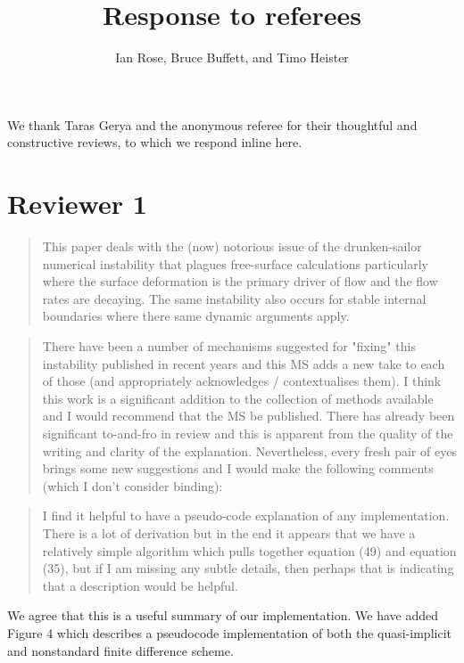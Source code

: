 \documentclass[a4paper,12pt]{article}
\title{Response to referees}
\author{Ian Rose, Bruce Buffett, and Timo Heister}
\date{}
\begin{document}
\maketitle

We thank Taras Gerya and the anonymous referee for their thoughtful and constructive reviews,
to which we respond inline here.

\section*{ Reviewer 1}

\begin{quotation}
  This paper deals with the (now) notorious issue of the drunken-sailor numerical instability that plagues free-surface calculations particularly where the surface deformation is the primary driver of flow and the flow rates are decaying. The same instability also occurs for stable internal boundaries where there same dynamic arguments apply.
\end{quotation}

\begin{quotation}
There have been a number of mechanisms suggested for "fixing" this instability published in recent years and this MS adds a new take to each of those (and appropriately acknowledges / contextualises them). I think this work is a significant addition to the collection of methods available and I would recommend that the MS be published. There has already been significant to-and-fro in review and this is apparent from the quality of the writing and clarity of the explanation. Nevertheless, every fresh pair of eyes brings some new suggestions and I would make the following comments (which I don't consider binding):
\end{quotation}



\begin{quotation}
I find it helpful to have a pseudo-code explanation of any implementation. There is a lot of derivation but in the end it appears that we have a relatively simple algorithm which pulls together equation (49) and equation (35), but if I am missing any subtle details, then perhaps that is indicating that a description would be helpful.
\end{quotation}

We agree that this is a useful summary of our implementation.
We have added Figure 4 which describes a pseudocode implementation
of both the quasi-implicit and nonstandard finite difference scheme.
\end{document}
